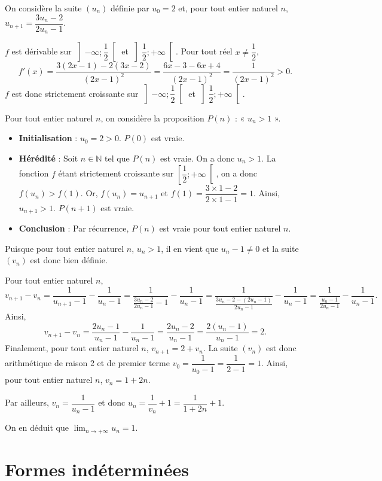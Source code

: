 \documentclass[11pt,fleqn]{book} %
\begin{document}
\begin{solution}On considère la suite $(u_n)$ définie par $u_0=2$ et, pour tout entier naturel $n$, $u_{n+1}=\dfrac{3u_n-2}{2u_n-1}$.

$f$ est dérivable sur $\left]-\infty ; \dfrac{1}{2} \right[$ et $\left]\dfrac{1}{2} ; + \infty \right[$. Pour tout réel $x\neq \dfrac{1}{2}$,
\[f'(x)=\dfrac{3(2x-1)-2(3x-2)}{(2x-1)^2} = \dfrac{6x-3-6x+4}{(2x-1)^2}=\dfrac{1}{(2x-1)^2} >0.\]
$f$ est donc strictement croissante sur $\left]-\infty ; \dfrac{1}{2} \right[$ et $\left]\dfrac{1}{2} ; + \infty \right[$.

Pour tout entier naturel $n$, on considère la proposition $P(n)$ : « $u_n >1$ ».
\begin{itemize}
\item \textbf{Initialisation} : $u_0=2>0$. $P(0)$ est vraie.
\item \textbf{Hérédité} : Soit $n\in \mathbb{N}$ tel que $P(n)$ est vraie. On a donc $u_n>1$. La fonction $f$ étant strictement croissante sur $\left[\dfrac{1}{2}; +\infty\right[$, on a donc $f(u_n)>f(1)$. Or, $f(u_n)=u_{n+1}$ et $f(1)=\dfrac{3 \times 1 -2}{2 \times 1 -1}=1$. Ainsi, $u_{n+1}>1$. $P(n+1)$ est vraie.
\item \textbf{Conclusion} : Par récurrence, $P(n)$ est vraie pour tout entier naturel $n$.
\end{itemize}

Puisque pour tout entier naturel $n$, $u_n>1$, il en vient que $u_n-1 \neq 0$ et la suite $(v_n)$ est donc bien définie.

Pour tout entier naturel $n$,
\[v_{n+1}-v_n=\dfrac{1}{u_{n+1}-1}-\dfrac{1}{u_n-1}=\dfrac{1}{\frac{3u_n-2}{2u_n-1}-1}-\dfrac{1}{u_n-1}=\dfrac{1}{\frac{3u_n-2-(2u_n-1)}{2u_n-1}}-\dfrac{1}{u_n-1}=\dfrac{1}{\frac{u_n-1}{2u_n-1}}-\dfrac{1}{u_n-1}.\]
Ainsi,
\[v_{n+1}-v_n=\dfrac{2u_n-1}{u_n-1}-\dfrac{1}{u_n-1}=\dfrac{2u_n-2}{u_n-1}=\dfrac{2(u_n-1)}{u_n-1}=2.\]
Finalement, pour tout entier naturel $n$, $v_{n+1}=2+v_n$. La suite $(v_n)$ est donc arithmétique de raison 2 et de premier terme $v_0=\dfrac{1}{u_0-1}=\dfrac{1}{2-1}=1$. Ainsi, pour tout entier naturel $n$, $v_n=1+2n$.

Par ailleurs, $v_n=\dfrac{1}{u_n-1}$ et donc $u_n=\dfrac{1}{v_n}+1=\dfrac{1}{1+2n}+1$.

On en déduit que  $\displaystyle\lim_{n \to +\infty}u_n =1$.
\end{solution}



\section*{Formes indéterminées}
\end{document}
